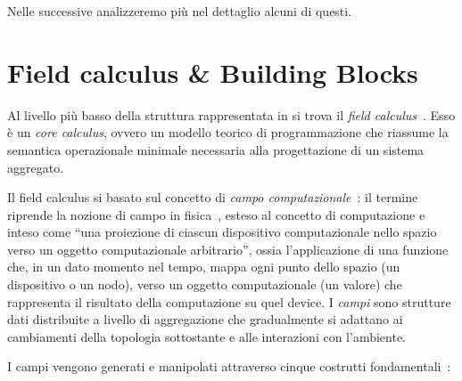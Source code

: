 Nelle  successive analizzeremo più nel dettaglio alcuni di questi.

\section[Field calculus]{Field calculus \& Building Blocks}\label{sec:field-calculus}

Al livello più basso della struttura rappresentata in  si trova il \emph{field calculus}~\cite{FieldCalculusFOCLASA2013}.
Esso è un \emph{core calculus}, ovvero un modello teorico di programmazione che riassume la semantica operazionale minimale necessaria alla progettazione di un sistema aggregato.

Il field calculus si basato sul concetto di \emph{campo computazionale}~\cite{FieldCalculusFOCLASA2013}:
il termine riprende la nozione di campo in fisica~\cite{mcmullin2002origins}, esteso al concetto di computazione
e inteso come ``una proiezione di ciascun dispositivo computazionale nello spazio verso un oggetto computazionale arbitrario'',
ossia l'applicazione di una funzione che, in un dato momento nel tempo, mappa ogni punto dello spazio (un dispositivo o un nodo),
verso un oggetto computazionale (un valore) che rappresenta il risultato della computazione su quel device.
I \emph{campi} sono strutture dati distribuite a livello di aggregazione che gradualmente si adattano ai cambiamenti della topologia sottostante e alle interazioni con l'ambiente.

I campi vengono generati e manipolati attraverso cinque costrutti fondamentali~\cite{BV-FOCAS2014,computationalfields-forte2015}:

